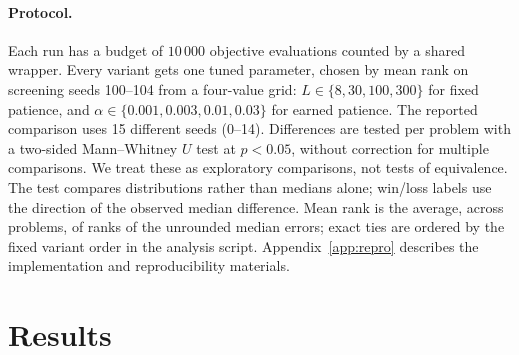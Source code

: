\documentclass[10pt,a4paper]{article}
\begin{document}
\paragraph{Protocol.} Each run has a budget of $10\,000$ objective evaluations counted by
a shared wrapper. Every variant gets one tuned parameter, chosen by mean rank on
screening seeds 100--104 from a four-value grid: $L \in \{8, 30, 100, 300\}$ for
fixed patience, and $\alpha \in \{0.001, 0.003, 0.01, 0.03\}$ for earned patience. The
reported comparison uses 15 different seeds (0--14). Differences are tested per problem
with a two-sided Mann--Whitney $U$ test \citep{mannwhitney1947} at $p<0.05$, without
correction for multiple comparisons. We treat these as exploratory comparisons,
not tests of equivalence. The test compares distributions rather than medians
alone; win/loss labels use the direction of the observed median difference.
Mean rank is the average, across problems, of ranks of
the unrounded median errors; exact ties are ordered by the fixed variant order
in the analysis script. Appendix~\ref{app:repro} describes the implementation and
reproducibility materials.

\section{Results}
\label{sec:results}
\end{document}
